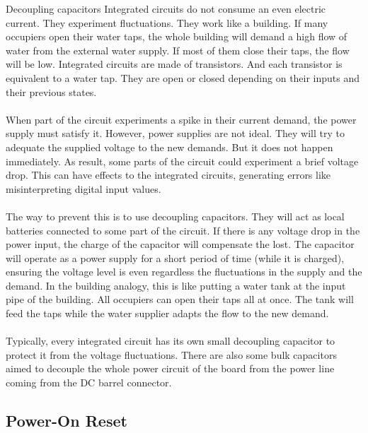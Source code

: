 \begin{theory}[htbp]{Decoupling capacitors}
  Integrated circuits do not consume an even electric current. They experiment fluctuations. They work like a building. If many occupiers open their water taps, the whole building will demand a high flow of water from the external water supply. If most of them close their taps, the flow will be low. Integrated circuits are made of transistors. And each transistor is equivalent to a water tap. They are open or closed depending on their inputs and their previous states.\\\\

  When part of the circuit experiments a spike in their current demand, the power supply must satisfy it. However, power supplies are not ideal. They will try to adequate the supplied voltage to the new demands. But it does not happen immediately. As result, some parts of the circuit could experiment a brief voltage drop. This can have effects to the integrated circuits, generating errors like misinterpreting digital input values.\\\\

  The way to prevent this is to use decoupling capacitors. They will act as local batteries connected to some part of the circuit. If there is any voltage drop in the power input, the charge of the capacitor will compensate the lost. The capacitor will operate as a power supply for a short period of time (while it is charged), ensuring the voltage level is even regardless the fluctuations in the supply and the demand. In the building analogy, this is like putting a water tank at the input pipe of the building. All occupiers can open their taps all at once. The tank will feed the taps while the water supplier adapts the flow to the new demand.\\\\

  Typically, every integrated circuit has its own small decoupling capacitor to protect it from the voltage fluctuations. There are also some bulk capacitors aimed to decouple the whole power circuit of the board from the power line coming from the DC barrel connector.
\end{theory}

\subsection{Power-On Reset}

